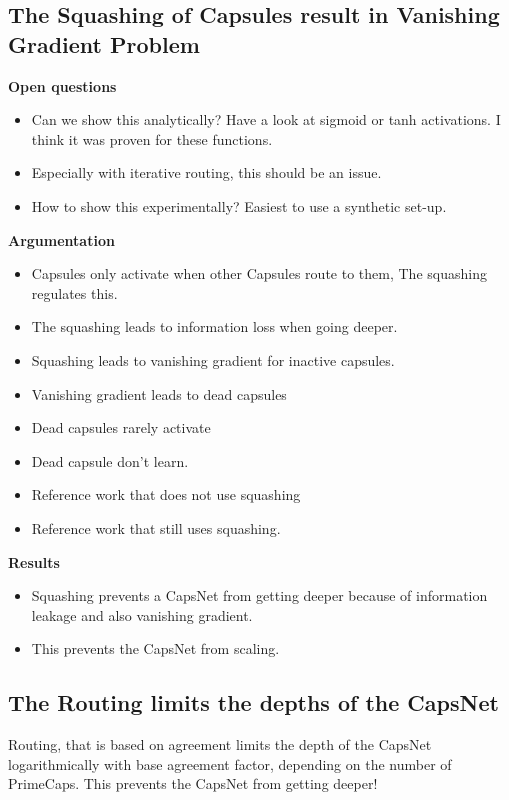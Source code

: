 \documentclass{article}
\begin{document}
\subsection{The Squashing of Capsules result in Vanishing Gradient Problem}
\textbf{Open questions}
\begin{itemize}
	\item Can we show this analytically? Have a look at sigmoid or tanh activations. I think it was proven for these functions.
	\item Especially with iterative routing, this should be an issue.
	\item How to show this experimentally? Easiest to use a synthetic set-up.
\end{itemize}

\textbf{Argumentation}
\begin{itemize}
	\item Capsules only activate when other Capsules route to them, The squashing regulates this.
	\item The squashing leads to information loss when going deeper.
	\item Squashing leads to vanishing gradient for inactive capsules.
	\item Vanishing gradient leads to dead capsules
	\item Dead capsules rarely activate
	\item Dead capsule don't learn.
	\item Reference work that does not use squashing
	\item Reference work that still uses squashing.
\end{itemize}

\textbf{Results}
\begin{itemize}
	\item Squashing prevents a CapsNet from getting deeper because of information leakage and also vanishing gradient.
	\item This prevents the CapsNet from scaling.
\end{itemize}

\subsection{The Routing limits the depths of the CapsNet}

Routing, that is based on agreement limits the depth of the CapsNet logarithmically with base agreement factor, depending on the number of PrimeCaps.
This prevents the CapsNet from getting deeper!
\end{document}
